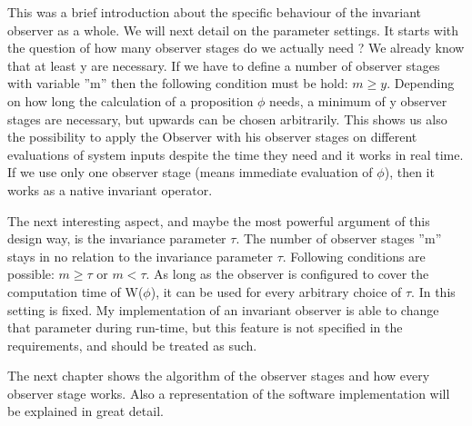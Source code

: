 This was a brief introduction about the specific behaviour of the invariant observer as a whole. We will next detail on the parameter settings.
It starts with the question of how many observer stages do we actually need ? We already know that at least y are necessary.
If we have to define a number of observer stages with variable ''m'' then the following condition must be hold: $m \ge y$.
Depending on how long the calculation of a proposition $\phi$ needs, a minimum of y observer stages are necessary, but upwards 
can be chosen arbitrarily. This shows us also the possibility to apply the Observer with his observer stages
on different evaluations of system inputs despite the time they need and it works in real time.
If we use only one observer stage (means immediate evaluation of $\phi$), then it works as a native invariant operator.\newline

The next interesting aspect, and maybe the most powerful argument of this design way, is the invariance parameter $\tau$.
The number of observer stages ''m'' stays in no relation to the invariance parameter $\tau$. Following conditions are possible:
$m \ge \tau$ or $m < \tau$. As long as the observer is configured to cover the computation time of W($\phi$), it can be
used for every arbitrary choice of $\tau$. In \cite{RTFMBJ13} this setting is fixed.
My implementation of an invariant observer is able to change that parameter during run-time, but this feature is not 
specified in the requirements, and should be treated as such.\newline

The next chapter shows the algorithm of the observer stages and how every observer stage works. 
Also a representation of the software implementation will be explained in great detail.

